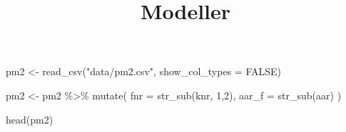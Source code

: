 \documentclass[
]{article}
\title{Modeller}
\author{}
\date{\vspace{-2.5em}}
\newenvironment{Shaded}{\begin{snugshade}}{\end{snugshade}}
\newcommand{\AttributeTok}[1]{\textcolor[rgb]{0.77,0.63,0.00}{#1}}
\newcommand{\ConstantTok}[1]{\textcolor[rgb]{0.00,0.00,0.00}{#1}}
\newcommand{\DecValTok}[1]{\textcolor[rgb]{0.00,0.00,0.81}{#1}}
\newcommand{\FunctionTok}[1]{\textcolor[rgb]{0.00,0.00,0.00}{#1}}
\newcommand{\NormalTok}[1]{#1}
\newcommand{\OtherTok}[1]{\textcolor[rgb]{0.56,0.35,0.01}{#1}}
\newcommand{\SpecialCharTok}[1]{\textcolor[rgb]{0.00,0.00,0.00}{#1}}
\newcommand{\StringTok}[1]{\textcolor[rgb]{0.31,0.60,0.02}{#1}}
\begin{document}
\maketitle

\begin{Shaded}
\end{Shaded}

\begin{Shaded}
\begin{Highlighting}[]
\NormalTok{pm2 }\OtherTok{\textless{}{-}} \FunctionTok{read\_csv}\NormalTok{(}\StringTok{"data/pm2.csv"}\NormalTok{, }\AttributeTok{show\_col\_types =} \ConstantTok{FALSE}\NormalTok{)}
\end{Highlighting}
\end{Shaded}

\begin{Shaded}
\begin{Highlighting}[]
\NormalTok{pm2 }\OtherTok{\textless{}{-}}\NormalTok{ pm2 }\SpecialCharTok{\%\textgreater{}\%} 
  \FunctionTok{mutate}\NormalTok{(}
    \AttributeTok{fnr =} \FunctionTok{str\_sub}\NormalTok{(knr, }\DecValTok{1}\NormalTok{,}\DecValTok{2}\NormalTok{),}
    \AttributeTok{aar\_f =} \FunctionTok{str\_sub}\NormalTok{(aar)}
\NormalTok{  )}
\end{Highlighting}
\end{Shaded}

\begin{Shaded}
\begin{Highlighting}[]
\FunctionTok{head}\NormalTok{(pm2)}
\end{Highlighting}
\end{Shaded}
\end{document}
